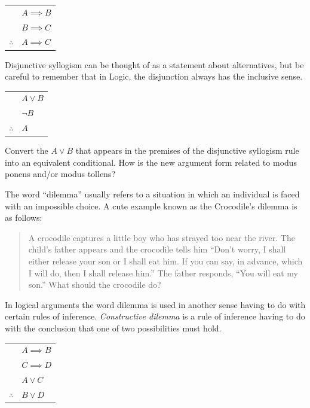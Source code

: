 \begin{center}
\begin{tabular}{cl}
 & $A \implies B$ \\
 & $B \implies C$ \\ \hline
$\therefore$ & $A \implies C$ \\
\end{tabular}
\end{center}

Disjunctive syllogism can be thought of as a statement about
alternatives, but be careful to remember that in Logic, the disjunction
always has the inclusive sense.

\begin{center}
\begin{tabular}{cl}
 & $A \lor B$ \\
 & ${\lnot}B$ \\ \hline
$\therefore$ & $A$ \\
\end{tabular}
\end{center}

\begin{exer}
Convert the $A \lor B$ that appears in the premises of the disjunctive
syllogism rule into an equivalent conditional.  How is the new argument
form related to modus ponens and/or modus tollens?
\end{exer}
 
The word ``dilemma'' usually refers to a situation in which an individual
is faced with an impossible choice.  A cute example known as the 
Crocodile's dilemma is as follows:

\begin{quote}
A crocodile captures a little boy who has strayed too near the river.  The 
child's father appears and the crocodile tells him ``Don't worry, I shall 
either release your son or I shall eat him.  If you can say, in advance,
which I will do, then I shall release him.''  The father responds, ``You will
eat my son.''  What should the crocodile do?
\end{quote} 

In logical arguments the word dilemma is used in another sense having to
do with certain rules of inference.  
\emph{Constructive dilemma} is 
a rule of inference having to do with the conclusion that one of two 
possibilities must hold.

\begin{center}
\begin{tabular}{cl}
 & $A \implies B$ \\
 & $C \implies D$ \\ 
 & $A \lor C$ \\ \hline
$\therefore$ & $B \lor D$ \\
\end{tabular}
\end{center}

